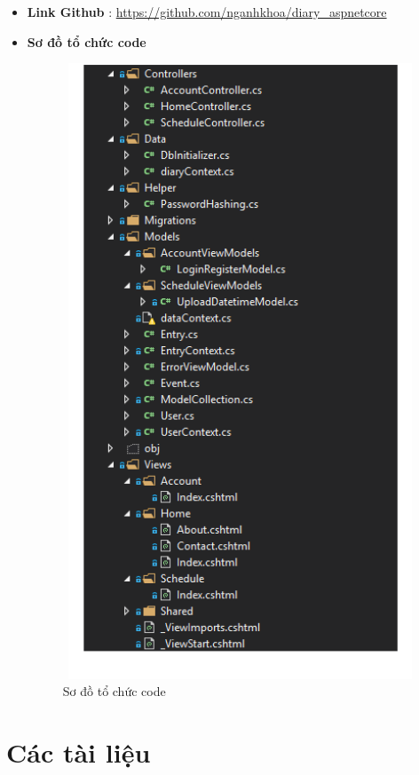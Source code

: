 \documentclass[a4paper]{article}
\begin{document}
	\begin{itemize}
		\item \textbf{Link Github} : \url{https://github.com/nganhkhoa/diary\_aspnetcore}




		\item \textbf{Sơ đồ tổ chức code}


		\begin{figure}[!h]
	 			\centering
      			\includegraphics[height=520pt,width=300pt]{Images/h14.png}
	 		 	\caption{Sơ đồ tổ chức code}
	 		 	\label{mainbook14}
	  		\end{figure}

	\end{itemize}


\section{Các tài liệu}
\end{document}
